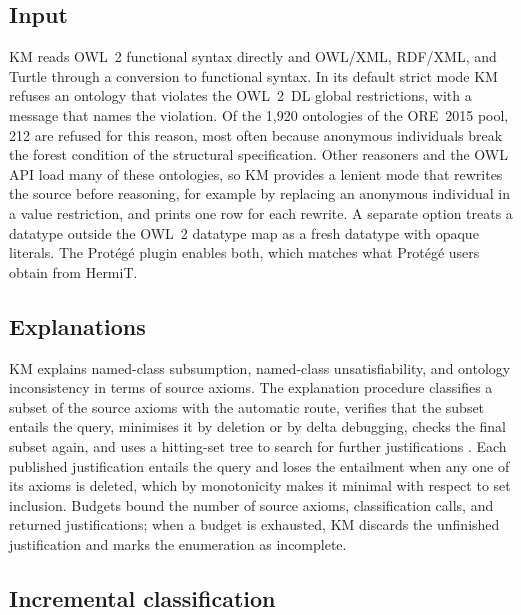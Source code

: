 \subsection{Input}

KM reads OWL~2 functional syntax directly and OWL/XML, RDF/XML, and Turtle
through a conversion to functional syntax.  In its default strict mode KM
refuses an ontology that violates the OWL~2~DL global restrictions, with a
message that names the violation.  Of the 1,920 ontologies of the ORE~2015
pool, 212 are refused for this reason, most often because anonymous individuals
break the forest condition of the structural specification.  Other reasoners
and the OWL API load many of these ontologies, so KM provides a lenient mode
that rewrites the source before reasoning, for example by replacing an
anonymous individual in a value restriction, and prints one row for each
rewrite.  A separate option treats a datatype outside the OWL~2 datatype map
as a fresh datatype with opaque literals.  The Prot\'eg\'e plugin enables both,
which matches what Prot\'eg\'e users obtain from HermiT.

\subsection{Explanations}

KM explains named-class subsumption, named-class unsatisfiability, and
ontology inconsistency in terms of source axioms.  The explanation procedure
classifies a subset of the source axioms with the automatic route, verifies
that the subset entails the query, minimises it by deletion or by delta
debugging, checks the final subset again, and uses a hitting-set tree to
search for further justifications
\cite{kalyanpur2007debugging,horridge2011justification}.  Each published
justification entails the query and loses the entailment when any one of its
axioms is deleted, which by monotonicity makes it minimal with respect to set
inclusion.  Budgets bound the number of source axioms, classification calls,
and returned justifications; when a budget is exhausted, KM discards the
unfinished justification and marks the enumeration as incomplete.

\subsection{Incremental classification}

